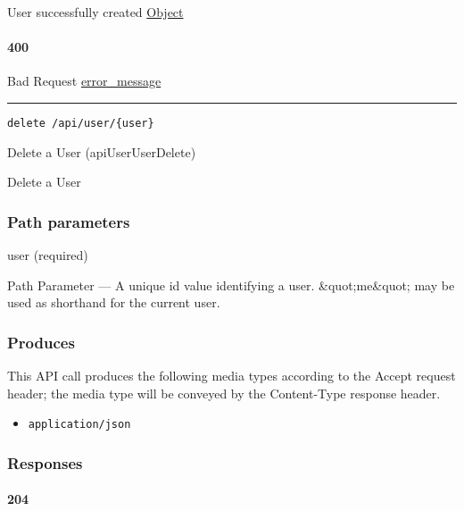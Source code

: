 User successfully created \protect\hyperlink{Object}{Object}

\hypertarget{section-261}{%
\paragraph{400}\label{section-261}}

Bad Request \protect\hyperlink{error_message}{error\_message}

\begin{center}\rule{0.5\linewidth}{\linethickness}\end{center}

\protect\hypertarget{apiUserUserDelete}{}{}

\begin{verbatim}
delete /api/user/{user}
\end{verbatim}

Delete a User ({apiUserUserDelete})

Delete a User

\hypertarget{path-parameters-39}{%
\subsubsection{Path parameters}\label{path-parameters-39}}

user (required)

{Path Parameter} --- A unique id value identifying a user.
\&quot;me\&quot; may be used as shorthand for the current user.

\hypertarget{produces-79}{%
\subsubsection{Produces}\label{produces-79}}

This API call produces the following media types according to the
{Accept} request header; the media type will be conveyed by the
{Content-Type} response header.

\begin{itemize}
\tightlist
\item
  \texttt{application/json}
\end{itemize}

\hypertarget{responses-81}{%
\subsubsection{Responses}\label{responses-81}}

\hypertarget{section-262}{%
\paragraph{204}\label{section-262}}

